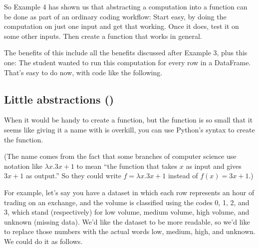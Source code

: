 \documentclass[letterpaper,10pt,english]{sphinxmanual}
\begin{document}
So Example 4 has shown us that abstracting a computation into a function can be done as part of an ordinary coding workflow:  Start easy, by doing the computation on just one input and get that working.  Once it does, test it on some other inputs.  Then create a function that works in general.

The benefits of this include all the benefits discussed after Example 3, plus this one:  The student wanted to run this computation for every row in a DataFrame.  That’s easy to do now, with code like the following.

\begin{sphinxVerbatim}[commandchars=\\\{\}]
\PYG{p}{[}\PYG{p}{]}  \PYG{p}{[}\PYG{p}{]}  
\PYG{p}{[}\PYG{p}{]}  \PYG{p}{[}\PYG{p}{]}  
\end{sphinxVerbatim}


\subsection{Little abstractions ()}
\label{\detokenize{chapter-7-abstraction:little-abstractions-lambda}}
When it would be handy to create a function, but the function is so small that it seems like giving it a name with  is overkill, you can use Python’s  syntax to create the function.

(The name comes from the fact that some branches of computer science use notation like \(\lambda x.3x+1\) to mean “the function that takes \(x\) as input and gives \(3x+1\) as output.”  So they could write \(f=\lambda x.3x+1\) instead of \(f(x)=3x+1\).)

For example, let’s say you have a dataset in which each row represents an hour of trading on an exchange, and the volume is classified using the codes 0, 1, 2, and 3, which stand (respectively) for low volume, medium volume, high volume, and unknown (missing data).  We’d like the dataset to be more readable, so we’d like to replace those numbers with the actual words low, medium, high, and unknown.  We could do it as follows.
\end{document}
